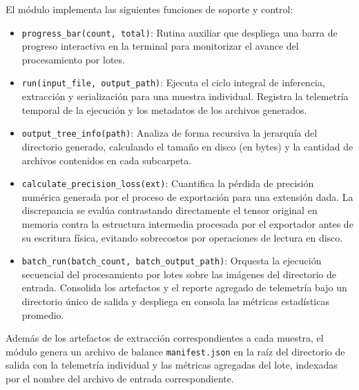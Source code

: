 El módulo implementa las siguientes funciones de soporte y control:
\begin{itemize}
    \item \texttt{progress\_bar(count, total)}: Rutina auxiliar que despliega una barra de progreso interactiva en la terminal para monitorizar 
    el avance del procesamiento por lotes.
    \item \texttt{run(input\_file, output\_path)}: Ejecuta el ciclo integral de inferencia, extracción y serialización para una muestra individual. 
    Registra la telemetría temporal de la ejecución y los metadatos de los archivos generados.
    \item \texttt{output\_tree\_info(path)}: Analiza de forma recursiva la jerarquía del directorio generado, calculando el tamaño en disco 
    (en bytes) y la cantidad de archivos contenidos en cada subcarpeta.
    \item \texttt{calculate\_precision\_loss(ext)}: Cuantifica la pérdida de precisión numérica generada por el proceso de exportación para 
    una extensión dada. La discrepancia se evalúa contrastando directamente el tensor original en memoria contra la estructura intermedia 
    procesada por el exportador antes de su escritura física, evitando sobrecostos por operaciones de lectura en disco.
    \item \texttt{batch\_run(batch\_count, batch\_output\_path)}: Orquesta la ejecución secuencial del procesamiento por lotes sobre las 
    imágenes del directorio de entrada. Consolida los artefactos y el reporte agregado de telemetría bajo un directorio único de salida y 
    despliega en consola las métricas estadísticas promedio.
\end{itemize}

Además de los artefactos de extracción correspondientes a cada muestra, el módulo genera un archivo de balance \texttt{manifest.json} en 
la raíz del directorio de salida con la telemetría individual y las métricas agregadas del lote, indexadas por el nombre del archivo 
de entrada correspondiente.

